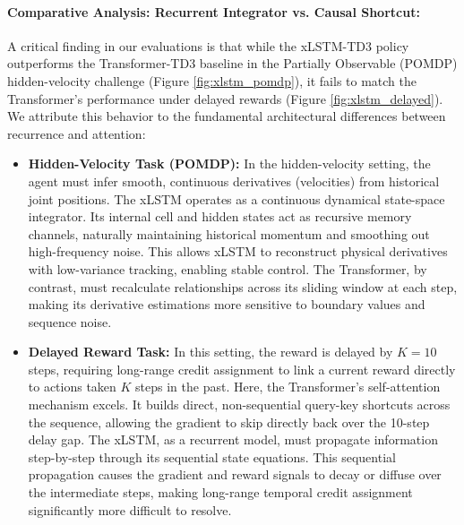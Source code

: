 \documentclass[11pt,a4paper]{article}
\begin{document}
\paragraph{Comparative Analysis: Recurrent Integrator vs. Causal Shortcut:}
A critical finding in our evaluations is that while the xLSTM-TD3 policy outperforms the Transformer-TD3 baseline in the Partially Observable (POMDP) hidden-velocity challenge (Figure \ref{fig:xlstm_pomdp}), it fails to match the Transformer's performance under delayed rewards (Figure \ref{fig:xlstm_delayed}). We attribute this behavior to the fundamental architectural differences between recurrence and attention:
\begin{itemize}
    \item \textbf{Hidden-Velocity Task (POMDP):} In the hidden-velocity setting, the agent must infer smooth, continuous derivatives (velocities) from historical joint positions. The xLSTM operates as a continuous dynamical state-space integrator. Its internal cell and hidden states act as recursive memory channels, naturally maintaining historical momentum and smoothing out high-frequency noise. This allows xLSTM to reconstruct physical derivatives with low-variance tracking, enabling stable control. The Transformer, by contrast, must recalculate relationships across its sliding window at each step, making its derivative estimations more sensitive to boundary values and sequence noise.
    \item \textbf{Delayed Reward Task:} In this setting, the reward is delayed by $K=10$ steps, requiring long-range credit assignment to link a current reward directly to actions taken $K$ steps in the past. Here, the Transformer's self-attention mechanism excels. It builds direct, non-sequential query-key shortcuts across the sequence, allowing the gradient to skip directly back over the 10-step delay gap. The xLSTM, as a recurrent model, must propagate information step-by-step through its sequential state equations. This sequential propagation causes the gradient and reward signals to decay or diffuse over the intermediate steps, making long-range temporal credit assignment significantly more difficult to resolve.
\end{itemize}
\end{document}
